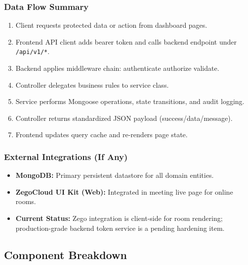 \documentclass[12pt,a4paper]{article}
\begin{document}
\subsubsection{Data Flow Summary}

\begin{enumerate}[noitemsep]
  \item Client requests protected data or action from dashboard pages.
  \item Frontend API client adds bearer token and calls backend endpoint under \texttt{/api/v1/*}.
  \item Backend applies middleware chain: authenticate \rightarrow authorize \rightarrow validate.
  \item Controller delegates business rules to service class.
  \item Service performs Mongoose operations, state transitions, and audit logging.
  \item Controller returns standardized JSON payload (success/data/message).
  \item Frontend updates query cache and re-renders page state.
\end{enumerate}

\subsubsection{External Integrations (If Any)}

\begin{itemize}[noitemsep]
  \item \textbf{MongoDB:} Primary persistent datastore for all domain entities.
  \item \textbf{ZegoCloud UI Kit (Web):} Integrated in meeting live page for online rooms.
  \item \textbf{Current Status:} Zego integration is client-side for room rendering; production-grade backend token service is a pending hardening item.
\end{itemize}

\subsection{Component Breakdown}

\renewcommand{\arraystretch}{1.2}
\setlength{\tabcolsep}{4pt}
\end{document}
